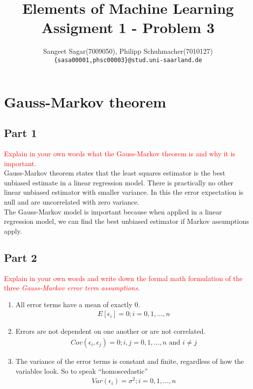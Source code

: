 \documentclass{article}[a4paper]
\title{\textbf{Elements of Machine Learning}\\
Assigment 1 - Problem 3
}
\author{ Sangeet Sagar(7009050), Philipp Schuhmacher(7010127)\\
        \texttt{\{sasa00001,phsc00003\}@stud.uni-saarland.de}
}
\begin{document}
\maketitle
\section*{Gauss-Markov theorem}
\subsection*{Part 1}
\textcolor{red}{Explain in your own words what the Gauss-Markov theorem is and why it is important.}\\
Gauss-Markov theorem states that the least squares estimator is the best unbiased estimate in a linear regression model. There is practically no other linear unbiased estimator with smaller variance. In this the error expectation is null and are uncorrelated with zero variance.\\
The Gauss-Markov model is important because when applied in a linear regression model, we can find the best unbiased estimator if Markov assumptions apply.

\subsection*{Part 2}
\textcolor{red}{Explain in your own words and write down the formal math formulation of the three \textit{Gauss-Markov error term assumptions}.}\\
\begin{enumerate}
    \item All error terms have a mean of exactly 0. 
    \begin{align*}
        E[\epsilon_i] = 0; i=0,1,\hdots,n
    \end{align*}
    \item Errors are not dependent on one another or are not correlated.
    \begin{align*}
        Cov(\epsilon_i, \epsilon_j) = 0; i,j=0,1,\hdots,n \text{ and } i \neq j
    \end{align*}
    \item The variance of the error terms is constant and finite, regardless of how the variables look. So to speak ``homoscedastic''
    \begin{align*}
        Var(\epsilon_i) = \sigma^2; i=0,1,\hdots,n
    \end{align*}
\end{enumerate}
\end{document}

